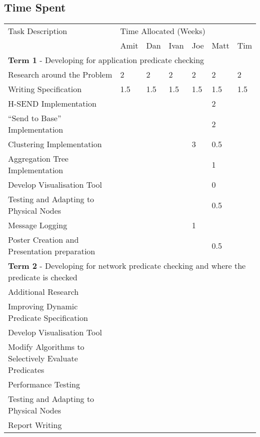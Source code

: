 \subsection{Time Spent}

\begin{table}[H]
	\centering
	\begin{tabular}{| l | l | l | l | l | l | l |}
	\hline
	Task Description & \multicolumn{6}{l|}{Time Allocated (Weeks)}\\
	~ & Amit & Dan & Ivan & Joe & Matt & Tim \\
	\hline
	\hline
	\multicolumn{7}{|l|}{\textbf{Term 1} - Developing for application predicate checking} \\
	\hline


	Research around the Problem & 2 & 2 & 2 & 2 & 2 & 2\\
	Writing Specification & 1.5 & 1.5 & 1.5 & 1.5 & 1.5 & 1.5\\
	H-SEND Implementation & ~ & ~ & ~ & ~ & 2 & ~\\
	``Send to Base'' Implementation & ~ & ~ & ~ & ~ & 2 & ~\\
	Clustering Implementation & ~ & ~ & ~ & 3 & 0.5 & ~\\
	Aggregation Tree Implementation & ~ & ~ & ~ & ~ & 1 & ~\\
	Develop Visualisation Tool & ~ & ~ & ~ & ~ & 0 & ~\\
	Testing and Adapting to Physical Nodes & ~ & ~ & ~ & ~ & 0.5 & ~\\
	Message Logging & ~ & ~ & ~ & 1 & ~ & ~\\
	Poster Creation and Presentation preparation & ~ & ~ & ~ & ~ & 0.5 & ~\\

	\hline
	\hline
	\multicolumn{7}{|l|}{\textbf{Term 2} - Developing for network predicate checking and where the predicate is checked} \\
	\hline
	
	Additional Research & ~ & ~ & ~ & ~ & ~ & ~\\
	Improving Dynamic Predicate Specification & ~ & ~ & ~ & ~ & ~ & ~\\
	Develop Visualisation Tool & ~ & ~ & ~ & ~ & ~ & ~\\
	Modify Algorithms to Selectively Evaluate Predicates & ~ & ~ & ~ & ~ & ~ & ~\\
	Performance Testing & ~ & ~ & ~ & ~ & ~ & ~\\
	Testing and Adapting to Physical Nodes & ~ & ~ & ~ & ~ & ~ & ~\\
	Report Writing & ~ & ~ & ~ & ~ & ~ & ~\\
	
	\hline
	
	\end{tabular}
\end{table}



